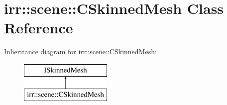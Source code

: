 \hypertarget{classirr_1_1scene_1_1_c_skinned_mesh}{\section{irr\-:\-:scene\-:\-:C\-Skinned\-Mesh Class Reference}
\label{classirr_1_1scene_1_1_c_skinned_mesh}
}
Inheritance diagram for irr\-:\-:scene\-:\-:C\-Skinned\-Mesh\-:\begin{figure}[H]
\begin{center}
\leavevmode
\includegraphics[height=2.000000cm]{classirr_1_1scene_1_1_c_skinned_mesh}
\end{center}
\end{figure}
